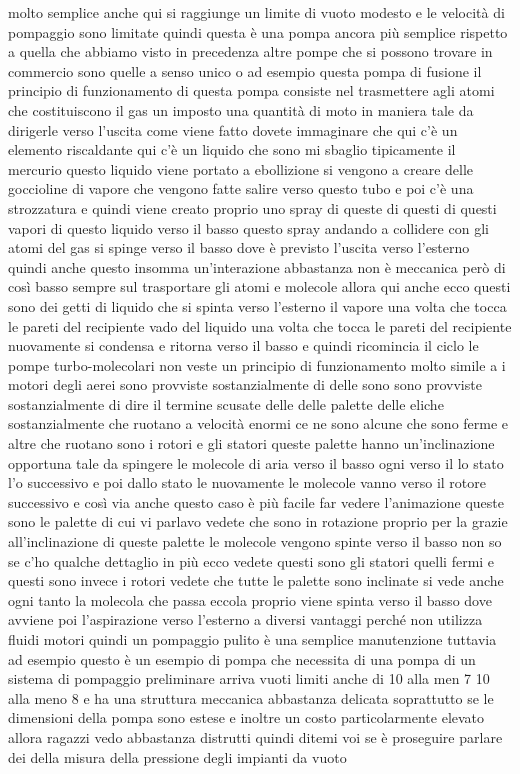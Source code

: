 molto semplice anche qui si raggiunge un limite di vuoto modesto e le velocità di pompaggio sono limitate quindi questa è una pompa ancora più semplice rispetto a quella che abbiamo visto in precedenza altre pompe che si possono trovare in commercio sono quelle a senso unico o ad esempio questa pompa di fusione il principio di funzionamento di questa pompa consiste nel trasmettere agli atomi che costituiscono il gas un imposto una quantità di moto in maniera tale da dirigerle verso l'uscita come viene fatto dovete immaginare che qui c'è un elemento riscaldante qui c'è un liquido che sono mi sbaglio tipicamente il mercurio questo liquido viene portato a ebollizione si vengono a creare delle goccioline di vapore che vengono fatte salire verso questo tubo e poi c'è una strozzatura e quindi viene creato proprio uno spray di queste di questi di questi vapori di questo liquido verso il basso questo spray andando a collidere con gli atomi del gas si spinge verso il basso dove è previsto l'uscita verso l'esterno quindi anche questo insomma un'interazione abbastanza non è meccanica però di così basso sempre sul trasportare gli atomi e molecole allora qui anche ecco questi sono dei getti di liquido che si spinta verso l'esterno il vapore una volta che tocca le pareti del recipiente vado del liquido una volta che tocca le pareti del recipiente nuovamente si condensa e ritorna verso il basso e quindi ricomincia il ciclo le pompe turbo-molecolari non veste un principio di funzionamento molto simile a i motori degli aerei sono provviste sostanzialmente di delle sono sono provviste sostanzialmente di dire il termine scusate delle delle palette delle eliche sostanzialmente che ruotano a velocità enormi ce ne sono alcune che sono ferme e altre che ruotano sono i rotori e gli statori queste palette hanno un'inclinazione opportuna tale da spingere le molecole di aria verso il basso ogni verso il lo stato l'o successivo e poi dallo stato le nuovamente le molecole vanno verso il rotore successivo e così via anche questo caso è più facile far vedere l'animazione queste sono le palette di cui vi parlavo vedete che sono in rotazione proprio per la grazie all'inclinazione di queste palette le molecole vengono spinte verso il basso non so se c'ho qualche dettaglio in più ecco vedete questi sono gli statori quelli fermi e questi sono invece i rotori vedete che tutte le palette sono inclinate si vede anche ogni tanto la molecola che passa eccola proprio viene spinta verso il basso dove avviene poi l'aspirazione verso l'esterno a diversi vantaggi perché non utilizza fluidi motori quindi un pompaggio pulito è una semplice manutenzione tuttavia ad esempio questo è un esempio di pompa che necessita di una pompa di un sistema di pompaggio preliminare arriva vuoti limiti anche di 10 alla men 7 10 alla meno 8 e ha una struttura meccanica abbastanza delicata soprattutto se le dimensioni della pompa sono estese e inoltre un costo particolarmente elevato allora ragazzi vedo abbastanza distrutti quindi ditemi voi se è proseguire parlare dei della misura della pressione degli impianti da vuoto

